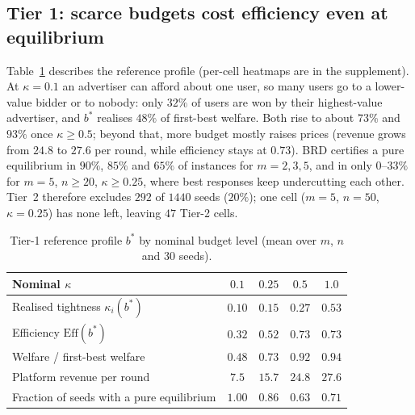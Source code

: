 \documentclass{article}
\theoremstyle{definition}
\newcommand{\Eff}{\mathrm{Eff}}
\begin{document}
\subsection{Tier 1: scarce budgets cost efficiency even at equilibrium}
Table~\ref{tab:t1} describes the reference profile (per-cell heatmaps are in the supplement). At $\kappa=0.1$ an advertiser
can afford about one user, so many users go to a lower-value bidder or to nobody: only $32\%$ of users are
won by their highest-value advertiser, and $b^\ast$ realises $48\%$ of first-best welfare. Both rise to
about $73\%$ and $93\%$ once $\kappa\ge0.5$; beyond that, more budget mostly raises prices (revenue grows
from $24.8$ to $27.6$ per round, while efficiency stays at $0.73$). BRD certifies a pure equilibrium in
$90\%$, $85\%$ and $65\%$ of instances for $m=2,3,5$, and in only $0$--$33\%$ for $m=5$, $n\ge20$,
$\kappa\ge0.25$, where best responses keep undercutting each other. Tier~2 therefore excludes $292$ of
$1440$ seeds ($20\%$); one cell ($m=5$, $n=50$, $\kappa=0.25$) has none left, leaving $47$ Tier-2 cells.

\begin{table}[t]
\caption{Tier-1 reference profile $b^\ast$ by nominal budget level (mean over $m$, $n$ and $30$ seeds).}
\label{tab:t1}
\centering\small
\begin{tabular}{@{}lcccc@{}}
\toprule
Nominal $\kappa$ & $0.1$ & $0.25$ & $0.5$ & $1.0$\\
\midrule
Realised tightness $\kappa_i(b^\ast)$ & $0.10$ & $0.15$ & $0.27$ & $0.53$\\
Efficiency $\Eff(b^\ast)$ & $0.32$ & $0.52$ & $0.73$ & $0.73$\\
Welfare / first-best welfare & $0.48$ & $0.73$ & $0.92$ & $0.94$\\
Platform revenue per round & $7.5$ & $15.7$ & $24.8$ & $27.6$\\
Fraction of seeds with a pure equilibrium & $1.00$ & $0.86$ & $0.63$ & $0.71$\\
\bottomrule
\end{tabular}
\end{table}
\end{document}
